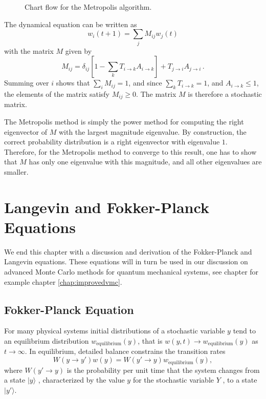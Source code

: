 \begin{figure}
\begin{centering}
\caption{Chart flow for the Metropolis algorithm.}\label{fig:chartFlowMetro}
\end{centering}
\end{figure}


The dynamical equation can be written as
\begin{equation}
w_i(t+1) = \sum_j M_{ij}w_j(t)
\end{equation}
with the matrix $M$ given by
\begin{equation}
M_{ij} = \delta_{ij}\left [ 1 -\sum_k T_{i\rightarrow k} A_{i \rightarrow k}
\right ] + T_{j\rightarrow i} A_{j\rightarrow i} \,.
\end{equation}
Summing over $i$ shows that $\sum_i M_{ij} = 1$, and since
$\sum_k T_{i\rightarrow k} = 1$, and $A_{i \rightarrow k} \leq 1$, the
elements of the matrix satisfy $M_{ij} \geq 0$. The matrix $M$ is therefore
a stochastic matrix.

The Metropolis method is simply the power method for computing the
right eigenvector of $M$ with the largest magnitude eigenvalue.
By construction, the correct probability distribution is a right eigenvector
with eigenvalue $1$. Therefore, for the Metropolis method to converge
to this result, one has to  show that $M$ has only one eigenvalue with this
magnitude, and all other eigenvalues are smaller. 


\section{Langevin and Fokker-Planck Equations}
We end this chapter with a discussion and derivation of the Fokker-Planck and Langevin equations.
These equations will in turn be used in our discussion on advanced Monte Carlo methods
for quantum mechanical systems, see chapter for example chapter \ref{chap:improvedvmc}.

\subsection{Fokker-Planck Equation}
     For many physical systems initial distributions of a stochastic 
variable $y$ tend to an equilibrium distribution $w_{\mathrm{equilibrium}}(y)$, 
that is $w(y, t)\rightarrow w_{\mathrm{equilibrium}}(y)$ 
as $t\rightarrow\infty$. In
equilibrium, detailed balance constrains the transition rates
\[
     W(y\rightarrow y')w(y ) = W(y'\rightarrow y)w_{\mathrm{equilibrium}}(y),
\]
where $W(y'\rightarrow y)$ 
is the probability per unit time that the system changes
from a state $|y\rangle$ , characterized by the value $y$ 
for the stochastic variable $Y$ , to a state $|y'\rangle$.

